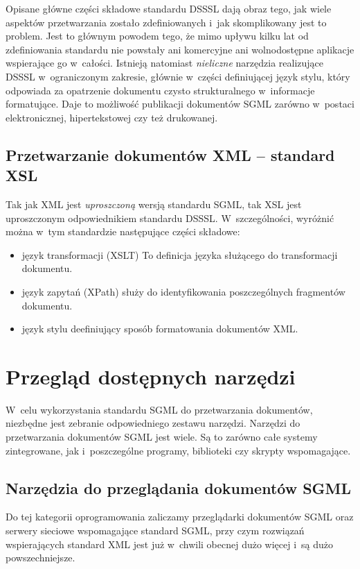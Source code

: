 \documentclass[document]{xmgr}
\begin{document}
Opisane główne części składowe standardu DSSSL dają obraz tego, jak
wiele aspektów przetwarzania zostało zdefiniowanych i~jak
skomplikowany jest to problem. Jest to głównym powodem tego, że mimo
upływu kilku lat od zdefiniowania standardu nie powstały ani
komercyjne ani wolnodostępne aplikacje wspierające go
w~całości. Istnieją natomiast \emph{nieliczne\/} narzędzia realizujące
DSSSL w~ograniczonym zakresie, głównie w~części definiującej język
stylu, który odpowiada za opatrzenie dokumentu czysto strukturalnego
w~informacje formatujące. Daje to możliwość publikacji dokumentów SGML
zarówno w~postaci elektronicznej, hipertekstowej czy też drukowanej.

\section{Przetwarzanie dokumentów XML -- standard XSL\label{s:xsl}}

Tak jak XML jest \emph{uproszczoną\/} wersją standardu SGML, tak XSL
jest uproszczonym odpowiednikiem standardu DSSSL. W~szczególności,
wyróżnić można w~tym standardzie następujące części składowe:

\begin{itemize}
\item język transformacji (XSLT) To definicja języka służącego do
  transformacji dokumentu.
\item język zapytań (XPath) służy do identyfikowania poszczególnych
  fragmentów dokumentu.
\item język stylu deefiniujący sposób formatowania dokumentów XML.
\end{itemize}

\chapter{Przegląd dostępnych narzędzi\label{PRZEGLAD.NARZEDZI}}

W~celu wykorzystania standardu SGML do przetwarzania dokumentów,
niezbędne jest zebranie odpowiedniego zestawu narzędzi. Narzędzi do
przetwarzania dokumentów SGML jest wiele. Są to zarówno całe
systemy zintegrowane, jak i~poszczególne programy, biblioteki czy
skrypty wspomagające.

\section{Narzędzia do przeglądania dokumentów SGML}

Do tej kategorii oprogramowania zaliczamy przeglądarki dokumentów
SGML oraz serwery sieciowe wspomagające standard SGML, przy
czym rozwiązań wspierających standard XML jest już w~chwili obecnej
dużo więcej i~są dużo powszechniejsze.
\end{document}
